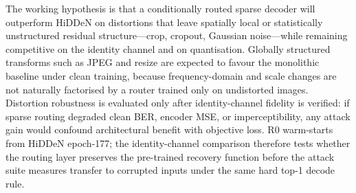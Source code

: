 ﻿\documentclass[12pt, a4paper, twoside]{report}
\numberwithin{equation}{chapter}
\begin{document}
The working hypothesis is that a conditionally routed sparse decoder will outperform HiDDeN on distortions that leave spatially local or statistically unstructured residual structure---crop, cropout, Gaussian noise---while remaining competitive on the identity channel and on quantisation. Globally structured transforms such as JPEG and resize are expected to favour the monolithic baseline under clean training, because frequency-domain and scale changes are not naturally factorised by a router trained only on undistorted images. Distortion robustness is evaluated only after identity-channel fidelity is verified: if sparse routing degraded clean BER, encoder MSE, or imperceptibility, any attack gain would confound architectural benefit with objective loss. R0 warm-starts from HiDDeN epoch-177; the identity-channel comparison therefore tests whether the routing layer preserves the pre-trained recovery function before the attack suite measures transfer to corrupted inputs under the same hard top-1 decode rule.
\end{document}
